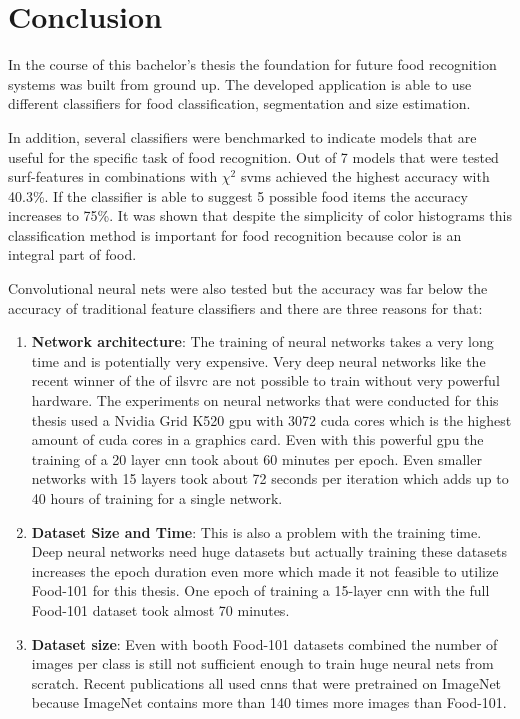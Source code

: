 
\chapter{Conclusion}
\label{ch:conclusion}
In the course of this bachelor's thesis the foundation for future food recognition systems was built from ground up. The developed application is able to use different classifiers for food classification, segmentation and size estimation. 

In addition, several classifiers were benchmarked to indicate models that are useful for the specific task of food recognition. Out of 7 models that were tested \gls{surf}-features in combinations with $\chi^2$ \glspl{svm} achieved the highest accuracy with 40.3\%. If the classifier is able to suggest 5 possible food items the accuracy increases to 75\%. It was shown that despite the simplicity of color histograms this classification method is important for food recognition because color is an integral part of food. 

Convolutional neural nets were also tested but the accuracy was far below the accuracy of traditional feature classifiers and there are three reasons for that:

\begin{enumerate}
	\item \textbf{Network architecture}: The training of neural networks takes a very long time and is potentially very expensive. Very deep neural networks like the recent winner of the of \gls{ilsvrc} are not possible to train without very powerful hardware. The experiments on neural networks that were conducted for this thesis used a Nvidia Grid K520 \gls{gpu} with 3072 \gls{cuda} cores which is the highest amount of \gls{cuda} cores in a graphics card. Even with this powerful \gls{gpu} the training of a 20 layer \gls{cnn} took about 60 minutes per epoch. Even smaller networks with 15 layers took about 72 seconds per iteration which adds up to 40 hours of training for a single network. 
	\item \textbf{Dataset Size and Time}: This is also a problem with the training time. Deep neural networks need huge datasets but actually training these datasets increases the epoch duration even more which made it not feasible to utilize Food-101 for this thesis. One epoch of training a 15-layer \gls{cnn} with the full Food-101 dataset took almost 70 minutes.
	\item \textbf{Dataset size}: Even with booth Food-101 datasets combined the number of images per class is still not sufficient enough to train huge neural nets from scratch. Recent publications all used \glspl{cnn} that were pretrained on ImageNet because ImageNet contains more than 140 times more images than Food-101.
\end{enumerate}


